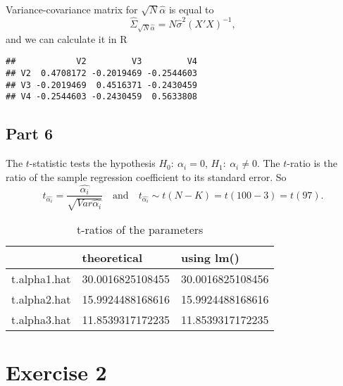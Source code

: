 \documentclass[12pt, a4paper]{article}\usepackage[]{graphicx}\usepackage[]{color}
\makeatletter
\newenvironment{kframe}{%
 \def\at@end@of@kframe{}%
 \ifinner\ifhmode%
  \def\at@end@of@kframe{\end{minipage}}%
  \begin{minipage}{\columnwidth}%
 \fi\fi%
 \def\FrameCommand##1{\hskip\@totalleftmargin \hskip-\fboxsep
 \colorbox{shadecolor}{##1}\hskip-\fboxsep
     \hskip-\linewidth \hskip-\@totalleftmargin \hskip\columnwidth}%
 \MakeFramed {\advance\hsize-\width
   \@totalleftmargin\z@ \linewidth\hsize
   \@setminipage}}%
 {\par\unskip\endMakeFramed%
 \at@end@of@kframe}
\newenvironment{knitrout}{}{} %
\makeatother
\begin{document}
Variance-covariance matrix for $\sqrt{N}\hat{\alpha}$ is equal to
\[ \hat{\Sigma}_{\sqrt{N}\hat{\alpha}} = N\hat{\sigma}^2 (X'X)^{-1},\]
and we can calculate it in R
\begin{knitrout}
\color{fgcolor}\begin{kframe}
\begin{verbatim}
##            V2         V3         V4
## V2  0.4708172 -0.2019469 -0.2544603
## V3 -0.2019469  0.4516371 -0.2430459
## V4 -0.2544603 -0.2430459  0.5633808
\end{verbatim}
\end{kframe}
\end{knitrout}



\subsection{Part 6}
The $t$-statistic tests the hypothesis $H_0:\ \alpha_i = 0$, $H_1:\ \alpha_i \neq 0$. The $t$-ratio is the ratio of the sample regression coefficient to its standard error. So
\[ t_{\hat{\alpha_i}} = \frac{\hat{\alpha_i}}{\sqrt{Var\hat{\alpha_i}}} \quad\text{and}\quad t_{\hat{\alpha_i}} \sim t(N-K) = t(100-3) = t(97). \]

\begin{table}[H]
\centering
\begin{tabular}{lll}
  \hline
  & theoretical & using lm() \\ 
  \hline
t.alpha1.hat & 30.0016825108455 & 30.0016825108456 \\ 
  t.alpha2.hat & 15.9924488168616 & 15.9924488168616 \\ 
  t.alpha3.hat & 11.8539317172235 & 11.8539317172235 \\ 
   \hline
\end{tabular}
\caption{t-ratios of the parameters} 
\label{tab:table2}
\end{table}








\section{Exercise 2}
\end{document}
